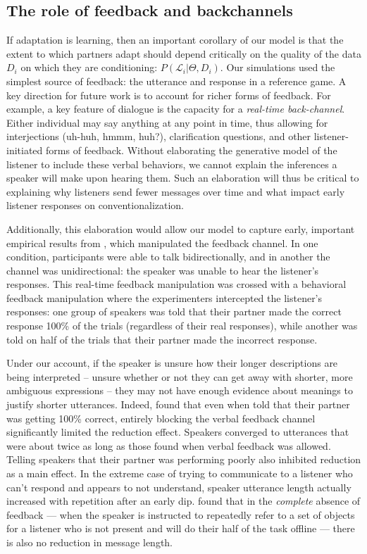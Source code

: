 \subsection{The role of feedback and backchannels}

If adaptation is learning, then an important corollary of our model is that the extent to which partners adapt should depend critically on the quality of the data $D_i$ on which they are conditioning: $P(\mathcal{L}_i | \Theta, D_i)$.
Our simulations used the simplest source of feedback: the utterance and response in a reference game.
A key direction for future work is to account for richer forms of feedback.
For example, a key feature of dialogue is the capacity for a \emph{real-time back-channel}.
Either individual may say anything at any point in time, thus allowing for interjections (uh-huh, hmmm, huh?), clarification questions, and other listener-initiated forms of feedback. 
Without elaborating the generative model of the listener to include these verbal behaviors, we cannot explain the inferences a speaker will make upon hearing them.
Such an elaboration will thus be critical to explaining why listeners send fewer messages over time and what impact early listener responses on conventionalization. 

Additionally, this elaboration would allow our model to capture early, important empirical results from , which manipulated the feedback channel.
In one condition, participants were able to talk bidirectionally, and in another the channel was unidirectional: the speaker was unable to hear the listener's responses. 
This real-time feedback manipulation was crossed with a behavioral feedback manipulation where the experimenters intercepted the listener's responses: one group of speakers was told that their partner made the correct response 100\% of the trials (regardless of their real responses), while another was told on half of the trials that their partner made the incorrect response. 

Under our account, if the speaker is unsure how their longer descriptions are being interpreted -- unsure whether or not they can get away with shorter, more ambiguous expressions -- they may not have enough evidence about meanings to justify shorter utterances. 
Indeed,  found that even when told that their partner was getting 100\% correct, entirely blocking the verbal feedback channel significantly limited the reduction effect. 
Speakers converged to utterances that were about twice as long as those found when verbal feedback was allowed.
Telling speakers that their partner was performing poorly also inhibited reduction as a main effect. 
In the extreme case of trying to communicate to a listener who can't respond and appears to not understand, speaker utterance length actually increased with repetition after an early dip. 
 found that in the \emph{complete} absence of feedback --- when the speaker is instructed to repeatedly refer to a set of objects for a listener who is not present and will do their half of the task offline --- there is also no reduction in message length. 

